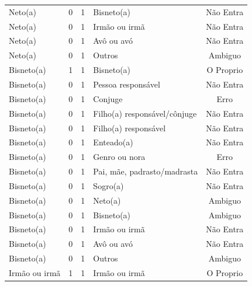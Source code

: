 \documentclass[
	12pt,				%
	openright,			%
	twoside,			%
	a4paper,			%
	english,			%
	french,				%
	spanish,			%
	brazil				%
	]{abntex2}
\begin{document}
\begin{anexosenv}
\begin{longtable}{@{}lcclc@{}}
Neto(a)                      & 0         & 1        & Bisneto(a)                   & Não Entra       \\
Neto(a)                      & 0         & 1        & Irmão ou irmã                & Não Entra       \\
Neto(a)                      & 0         & 1        & Avô ou avó                   & Não Entra       \\
Neto(a)                      & 0         & 1        & Outros                       & Ambiguo         \\
Bisneto(a)                   & 1         & 1        & Bisneto(a)                   & O Proprio       \\
Bisneto(a)                   & 0         & 1        & Pessoa responsável           & Não Entra       \\
Bisneto(a)                   & 0         & 1        & Conjuge                      & Erro            \\
Bisneto(a)                   & 0         & 1        & Filho(a) responsável/cônjuge & Não Entra       \\
Bisneto(a)                   & 0         & 1        & Filho(a) responsável         & Não Entra       \\
Bisneto(a)                   & 0         & 1        & Enteado(a)                   & Não Entra       \\
Bisneto(a)                   & 0         & 1        & Genro ou nora                & Erro            \\
Bisneto(a)                   & 0         & 1        & Pai, mãe, padrasto/madrasta  & Não Entra       \\
Bisneto(a)                   & 0         & 1        & Sogro(a)                     & Não Entra       \\
Bisneto(a)                   & 0         & 1        & Neto(a)                      & Ambiguo         \\
Bisneto(a)                   & 0         & 1        & Bisneto(a)                   & Ambiguo         \\
Bisneto(a)                   & 0         & 1        & Irmão ou irmã                & Não Entra       \\
Bisneto(a)                   & 0         & 1        & Avô ou avó                   & Não Entra       \\
Bisneto(a)                   & 0         & 1        & Outros                       & Ambiguo         \\
Irmão ou irmã                & 1         & 1        & Irmão ou irmã                & O Proprio       \\

\end{longtable}
\end{anexosenv}
\end{document}
